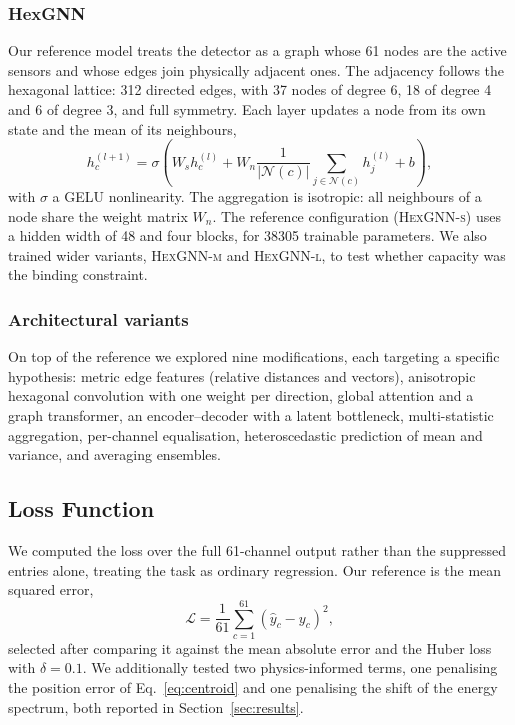 \documentclass[10pt,conference]{IEEEtran}
\begin{document}
\subsubsection{HexGNN}
Our reference model treats the detector as a graph whose 61 nodes are the
active sensors and whose edges join physically adjacent ones. The adjacency
follows the hexagonal lattice: 312 directed edges, with 37 nodes of degree 6,
18 of degree 4 and 6 of degree 3, and full symmetry. Each layer updates a node
from its own state and the mean of its neighbours,
%
\begin{equation}
h_{c}^{(l+1)} = \sigma\!\left( W_{s} h_{c}^{(l)}
  + W_{n} \frac{1}{|\mathcal{N}(c)|} \sum_{j \in \mathcal{N}(c)} h_{j}^{(l)}
  + b \right),
\label{eq:hexconv}
\end{equation}
%
with $\sigma$ a GELU nonlinearity. The aggregation is isotropic: all neighbours
of a node share the weight matrix $W_{n}$. The reference configuration
(\textsc{HexGNN-s}) uses a hidden width of 48 and four blocks, for
\num{38305} trainable parameters. We also trained wider variants,
\textsc{HexGNN-m} and \textsc{HexGNN-l}, to test whether capacity was the
binding constraint.

\subsubsection{Architectural variants}
On top of the reference we explored nine modifications, each targeting a
specific hypothesis: metric edge features (relative distances and vectors),
anisotropic hexagonal convolution with one weight per direction, global
attention and a graph transformer, an encoder--decoder with a latent
bottleneck, multi-statistic aggregation, per-channel equalisation,
heteroscedastic prediction of mean and variance, and averaging ensembles.

\subsection{Loss Function}
\label{sec:loss}

We computed the loss over the full 61-channel output rather than the suppressed
entries alone, treating the task as ordinary regression. Our reference is the
mean squared error,
%
\begin{equation}
\mathcal{L} = \frac{1}{61} \sum_{c=1}^{61} \left( \hat{y}_{c} - y_{c} \right)^{2},
\label{eq:loss}
\end{equation}
%
selected after comparing it against the mean absolute error and the Huber loss
with $\delta = 0.1$. We additionally tested two physics-informed terms, one
penalising the position error of Eq.~\ref{eq:centroid} and one penalising the
shift of the energy spectrum, both reported in Section~\ref{sec:results}.
\end{document}
